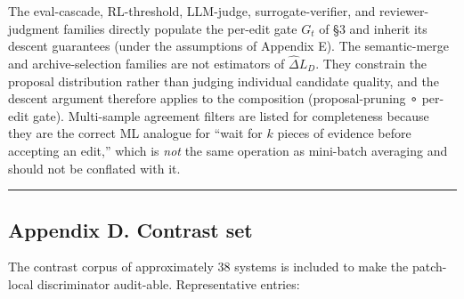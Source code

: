 The eval-cascade, RL-threshold, LLM-judge, surrogate-verifier, and
reviewer-judgment families directly populate the per-edit gate \(G_t\)
of §3 and inherit its descent guarantees (under the assumptions of
Appendix E). The semantic-merge and archive-selection families are not
estimators of \(\widehat{\Delta} L_D\). They constrain the proposal
distribution rather than judging individual candidate quality, and the
descent argument therefore applies to the composition (proposal-pruning
∘ per-edit gate). Multi-sample agreement filters are listed for
completeness because they are the correct ML analogue for ``wait for
\(k\) pieces of evidence before accepting an edit,'' which is \emph{not}
the same operation as mini-batch averaging and should not be conflated
with it.

\begin{center}\rule{0.5\linewidth}{0.5pt}\end{center}

\subsection{Appendix D. Contrast set}\label{appendix-d.-contrast-set}

The contrast corpus of approximately 38 systems is included to make the
patch-local discriminator audit-able. Representative entries:

